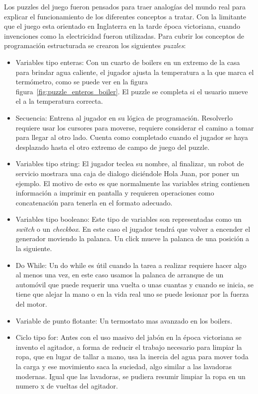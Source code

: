 Los puzzles del juego fueron pensados para traer analogías del mundo real para explicar el funcionamiento de los diferentes conceptos a tratar. Con la limitante que el juego esta orientado en Inglaterra en la tarde época victoriana, cuando invenciones como la electricidad fueron utilizadas.
Para cubrir los conceptos de programación estructurada se crearon los siguientes \textit{puzzles}:

\begin{itemize}
    \item Variables tipo enteras: Con un cuarto de boilers en un extremo de la casa para brindar agua caliente, el jugador ajusta la temperatura a la que marca el termómetro, como se puede ver en la figura figura~\ref{fig:puzzle_enteros_boiler}. El puzzle se completa si el usuario mueve el  a la temperatura correcta.
    \item Secuencia: Entrena al jugador en su lógica de programación. Resolverlo requiere usar los cursores para moverse, requiere considerar el camino a tomar para llegar al otro lado. Cuenta como completado cuando el jugador se haya desplazado hasta el otro extremo de campo de juego del puzzle.
    \item Variables tipo string: El jugador teclea su nombre, al finalizar, un robot de servicio mostrara una caja de dialogo diciéndole Hola Juan, por poner un ejemplo. El motivo de esto es que normalmente las variables string contienen información a imprimir en pantalla y requieren operaciones como concatenación para tenerla en el formato adecuado.
    \item  Variables tipo booleano: Este tipo de variables son representadas como un \textit{switch} o un \textit{checkbox}. En este caso el jugador tendrá que volver a encender el generador moviendo la palanca. Un click mueve la palanca de una posición a la siguiente.
    \item Do While: Un do while es útil cuando la tarea a realizar requiere hacer algo al menos una vez, en este caso usamos la palanca de arranque de un automóvil que puede requerir una vuelta o unas cuantas y cuando se inicia, se tiene que alejar la mano o en la vida real uno se puede lesionar por la fuerza del motor.
    \item Variable de punto flotante: Un termostato mas avanzado en los boilers.
    \item Ciclo tipo for: Antes con el uso masivo del jabón en la época victoriana se invento el agitador, a forma de reducir el trabajo necesario para limpiar la ropa, que en lugar de tallar a mano, usa la inercia del agua para mover toda la carga y ese movimiento saca la suciedad, algo similar a las lavadoras modernas. Igual que las lavadoras, se pudiera resumir limpiar la ropa en un numero x de vueltas del agitador.

\end{itemize}
